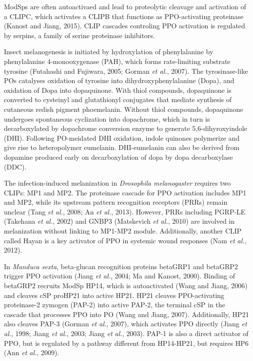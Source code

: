 \documentclass[11pt]{article}
\begin{document}
\begin{sloppypar}
ModSps are often autoactivaed and lead to proteolytic cleavage and activation of a CLIPC, which activates a CLIPB that functions as PPO-activating proteinase (Kanost and Jiang, 2015). 
CLIP cascades controling PPO activation is regulated by serpins, a family of serine proteinase inhibitors. 
\par
Insect melanogenesis is initiated by hydroxylation of phenylalanine by phenylalanine 4-monooxygenase (PAH), which forms rate-limiting substrate tyrosine (Futahashi and Fujiwara, 2005; Gorman \textit{et al.}, 2007). 
The tyrosinase-like POs catalyses oxidation of tyrosine into dihydroxyphenylalanine (Dopa), and oxidation of Dopa into dopaquinone. 
With thiol compounds, dopaquinone is converted to cysteinyl and glutathionyl conjugates that mediate synthesis of cutaneous redish pigment phoemelanin. 
Without thiol compounds, dopaquinone undergoes spontaneous cyclization into dopachrome, which in turn is decarboxylated by dopachrome conversion enzyme to generate 5,6-dihyroxyindole (DHI). 
Following PO-meidated DHI oxidation, indole quinones polymerize and give rise to heteropolymer eumelanin. 
DHI-eumelanin can also be derived from dopamine produced early on decarboxylation of dopa by dopa decarboxylase (DDC). 
\par
The infection-induced melanization in \textit{Drosophila melanogaster} requires two CLIPs: MP1 and MP2. 
The proteinase cascade for PPO activation includes MP1 and MP2, while its upstream pattern recognition receptors (PRRs) remain unclear (Tang \textit{et al.}, 2008; An \textit{et al.}, 2013). 
However, PRRs including PGRP-LE (Takehana \textit{et al.}, 2002) and GNBP3 (Matskevich \textit{et al.}, 2010) are involved in melanization without linking to MP1-MP2 module. 
Additionally, another CLIP called Hayan is a key activator of PPO in systemic wound responses (Nam \textit{et al.}, 2012). 
\par
In \textit{Manduca sexta}, beta-glucan recognition proteins betaGRP1 and betaGRP2 trigger PPO activation (Jiang \textit{et al.}, 2004; Ma and Kanost, 2000). 
Binding of betaGRP2 recruits ModSp HP14, which is autoactivated (Wang and Jiang, 2006) and cleaves cSP proHP21 into active HP21. 
HP21 cleaves PPO-activating proteinase-2 zymogen (PAP-2) into active PAP-2, the terminal cSP in the cascade that processes PPO into PO (Wang and Jiang, 2007). 
Additionally, HP21 also cleaves PAP-3 (Gorman \textit{et al.}, 2007), which activates PPO directly (Jiang \textit{et al.}, 1998; Jiang \textit{et al.}, 2003; Jiang \textit{et al.}, 2003). 
PAP-1 is also a direct activator of PPO, but is regulated by a pathway different from HP14-HP21, but requires HP6 (Ann \textit{et al.}, 2009). 

\end{sloppypar}
\end{document}
